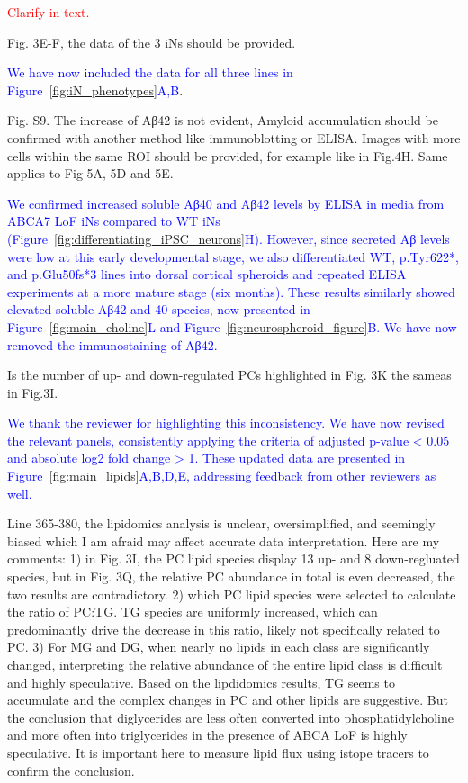 \textcolor{red}{Clarify in text.}

Fig. 3E-F, the data of the 3 iNs should be provided.

\textcolor{blue}{We have now included the data for all three lines in Figure~\ref{fig:iN_phenotypes}A,B}.

Fig. S9. The increase of Aβ42 is not evident, Amyloid accumulation should be confirmed with another method like immunoblotting or ELISA. Images with more cells within the same ROI should be provided, for example like in Fig.4H. Same applies to Fig 5A, 5D and 5E.

\textcolor{blue}{We confirmed increased soluble Aβ40 and Aβ42 levels by ELISA in media from ABCA7 LoF iNs compared to WT iNs (Figure~\ref{fig:differentiating_iPSC_neurons}H). However, since secreted Aβ levels were low at this early developmental stage, we also differentiated WT, p.Tyr622*, and p.Glu50fs*3 lines into dorsal cortical spheroids and repeated ELISA experiments at a more mature stage (six months). These results similarly showed elevated soluble Aβ42 and 40 species, now presented in Figure~\ref{fig:main_choline}L and Figure~\ref{fig:neurospheroid_figure}B. We have now removed the immunostaining of Aβ42.}

Is the number of up- and down-regulated PCs highlighted in Fig. 3K the sameas in Fig.3I.

\textcolor{blue}{We thank the reviewer for highlighting this inconsistency. We have now revised the relevant panels, consistently applying the criteria of adjusted p-value < 0.05 and absolute log2 fold change > 1. These updated data are presented in Figure~\ref{fig:main_lipids}A,B,D,E, addressing feedback from other reviewers as well.}

Line 365-380, the lipidomics analysis is unclear, oversimplified, and seemingly biased which I am afraid may affect accurate data interpretation. Here are my comments: 1) in Fig. 3I, the PC lipid species display 13 up- and 8 down-regluated species, but in Fig. 3Q, the relative PC abundance in total is even decreased, the two results are contradictory. 2) which PC lipid species were selected to calculate the ratio of PC:TG. TG species are uniformly increased, which can predominantly drive the decrease in this ratio, likely not specifically related to PC. 3) For MG and DG, when nearly no lipids in each class are significantly changed, interpreting the relative abundance of the entire lipid class is difficult and highly speculative. Based on the lipdidomics results, TG seems to accumulate and the complex changes in PC and other lipids are suggestive. But the conclusion that diglycerides are less often converted into phosphatidylcholine and more often into triglycerides in the presence of ABCA LoF is highly speculative. It is important here to measure lipid flux using istope tracers to confirm the conclusion.

